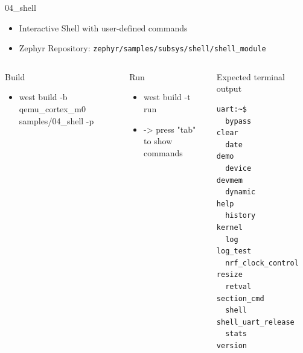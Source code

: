 \documentclass[10pt, aspectratio=169]{beamer}
\begin{document}
\begin{frame}[fragile]{04\_shell}

  \begin{itemize}
     \item Interactive Shell with user-defined commands
     \item Zephyr Repository: \texttt{zephyr/samples/subsys/shell/shell\_module}
  \end{itemize}

  \begin{columns}[T,onlytextwidth]
      \begin{block}{Build}
        \begin{itemize}
          \item {\scriptsize west build -b qemu\_cortex\_m0 samples/04\_shell -p}
        \end{itemize}
      \end{block}

     \begin{block}{Run}
        \begin{itemize}
          \item {\scriptsize west build -t run}
          \item {\scriptsize -> press "tab" to show commands}
        \end{itemize}
      \end{block}



      \begin{exampleblock}{Expected terminal output}

        {\fontsize{7}{9.6}\selectfont
          \begin{verbatim}
uart:~$ 
  bypass              clear
  date                demo
  device              devmem
  dynamic             help
  history             kernel
  log                 log_test
  nrf_clock_control   resize
  retval              section_cmd
  shell               shell_uart_release
  stats               version
          \end{verbatim}
        }
      \end{exampleblock}
  \end{columns}

\end{frame}
\end{document}
